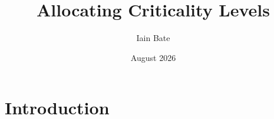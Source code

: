 \documentclass{article}
\title{Allocating Criticality Levels}
\author{Iain Bate}
\date{August 2026}
\begin{document}
\maketitle

\section{Introduction}
\end{document}
